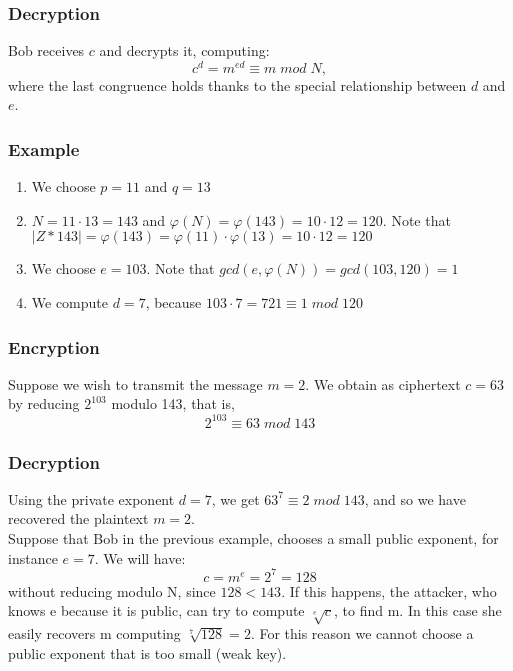 \documentclass[a4paper, 10pt, titlepage]{article}
\begin{document}
\subsubsection{Decryption}
Bob receives $c$ and decrypts it, computing:
$$c^d = m^{ed} \equiv m \; mod \; N,$$
where the last congruence holds thanks to the special relationship between $d$ and $e$.

\subsubsection{Example}
\begin{enumerate}
\item We choose $p = 11$ and $q = 13$
\item $N = 11 \cdot 13 = 143$ and $\varphi(N) = \varphi(143) = 10 \cdot 12 = 120$. Note that $|Z * 143| = \varphi(143) = \varphi(11) \cdot \varphi(13) = 10 \cdot 12 = 120$
\item We choose $e = 103$. Note that $gcd(e, \varphi(N)) = gcd(103, 120) = 1$
\item We compute $d = 7$, because $103 \cdot 7 = 721 \equiv 1 \; mod \; 120$
\end{enumerate}
\subsubsection*{Encryption}
Suppose we wish to transmit the message $m = 2$. We obtain as ciphertext $c = 63$ by reducing $2^{103}$ modulo 143, that is,
$$2^{103} \equiv 63 \; mod \; 143$$
\subsubsection*{Decryption}
Using the private exponent $d = 7$, we get $63^7 \equiv 2 \; mod \; 143$, and so we have recovered the plaintext $m = 2$. \medskip \\
Suppose that Bob in the previous example, chooses a small public
exponent, for instance $e = 7$. We will have:
$$c = m^e = 2^7 = 128$$
without reducing modulo N, since $128 < 143$.
If this happens, the attacker, who knows e because it is public, can try to compute $\sqrt[e]{c}$, to find m.
In this case she easily recovers m computing $\sqrt[7]{128} = 2$.
For this reason we cannot choose a public exponent that is too small
(weak key).
\end{document}
